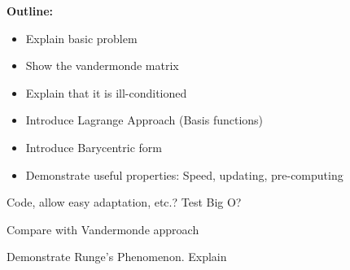 

{\bf Outline:}
\begin{itemize}
\item Explain basic problem
\item Show the vandermonde matrix
\item Explain that it is ill-conditioned
\item Introduce Lagrange Approach (Basis functions)
\item Introduce Barycentric form
\item Demonstrate useful properties: Speed, updating, pre-computing
\end{itemize}

\begin{problem}
Code, allow easy adaptation, etc.? Test Big O?
\end{problem}

\begin{problem}
Compare with Vandermonde approach
\end{problem}

\begin{problem}
Demonstrate Runge's Phenomenon. Explain
\end{problem}
